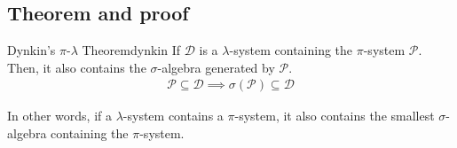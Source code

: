 \subsection{Theorem and proof}
\begin{theorem}{Dynkin's $\pi$-$\lambda$ Theorem}{dynkin}
    If $\mathcal{D}$ is a $\lambda$-system containing the $\pi$-system $\mathcal{P}$. Then, it also contains the $\sigma$-algebra generated by $\mathcal{P}$. 
    \begin{align*}
        \mathcal{P} \subseteq \mathcal{D} \implies \sigma(\mathcal{P}) \subseteq \mathcal{D}
    \end{align*}

    In other words, if a $\lambda$-system contains a $\pi$-system, it also contains the smallest $\sigma$-algebra containing the $\pi$-system.
\end{theorem}

